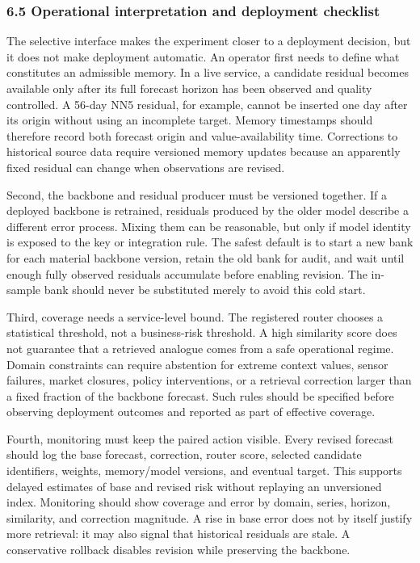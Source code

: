 \documentclass[
]{article}
\begin{document}
\subsubsection{6.5 Operational interpretation and deployment
checklist}\label{65-operational-interpretation-and-deployment-checklist}

The selective interface makes the experiment closer to a deployment
decision, but it does not make deployment automatic. An operator first
needs to define what constitutes an admissible memory. In a live
service, a candidate residual becomes available only after its full
forecast horizon has been observed and quality controlled. A 56-day NN5
residual, for example, cannot be inserted one day after its origin
without using an incomplete target. Memory timestamps should therefore
record both forecast origin and value-availability time. Corrections to
historical source data require versioned memory updates because an
apparently fixed residual can change when observations are revised.

Second, the backbone and residual producer must be versioned together.
If a deployed backbone is retrained, residuals produced by the older
model describe a different error process. Mixing them can be reasonable,
but only if model identity is exposed to the key or integration rule.
The safest default is to start a new bank for each material backbone
version, retain the old bank for audit, and wait until enough fully
observed residuals accumulate before enabling revision. The in-sample
bank should never be substituted merely to avoid this cold start.

Third, coverage needs a service-level bound. The registered router
chooses a statistical threshold, not a business-risk threshold. A high
similarity score does not guarantee that a retrieved analogue comes from
a safe operational regime. Domain constraints can require abstention for
extreme context values, sensor failures, market closures, policy
interventions, or a retrieval correction larger than a fixed fraction of
the backbone forecast. Such rules should be specified before observing
deployment outcomes and reported as part of effective coverage.

Fourth, monitoring must keep the paired action visible. Every revised
forecast should log the base forecast, correction, router score,
selected candidate identifiers, weights, memory/model versions, and
eventual target. This supports delayed estimates of base and revised
risk without replaying an unversioned index. Monitoring should show
coverage and error by domain, series, horizon, similarity, and
correction magnitude. A rise in base error does not by itself justify
more retrieval: it may also signal that historical residuals are stale.
A conservative rollback disables revision while preserving the backbone.
\end{document}
